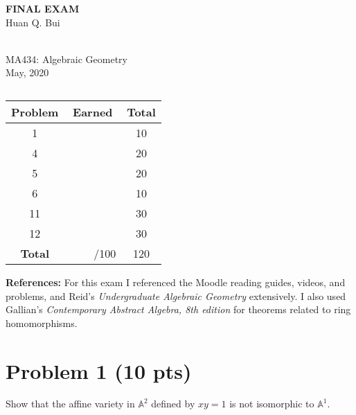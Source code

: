 \documentclass[12pt]{article}
\newcommand{\A}{\mathbb{A}}
\begin{document}
\begin{center}
	\LARGE{\textbf{FINAL EXAM}}
	\\
	\large{Huan Q. Bui}
	
	\noindent \hrulefill\\
	\small{MA434: Algebraic Geometry}\\
	\small{May, 2020}\\\vspace{-6pt}
	\hrulefill
\end{center}

 

$\,$\\
$\,$\\


\begin{center}
\begin{tabular}{|c|c|c|}
	\hline
	Problem & Earned & Total\\
	\hline
	1&&10\\
	\hline
	4&&20\\
	\hline
	5&&20\\
	\hline
	6&&10\\
	\hline
	11&&30\\
	\hline
	12&&30\\
	\hline
	\textbf{Total}&$\,\quad\quad$/100&120\\
	\hline
\end{tabular}
\end{center}



\noindent \textbf{References:} For this exam I referenced the Moodle reading guides, videos, and problems, and Reid's \textit{Undergraduate Algebraic Geometry} extensively. I also used Gallian's \textit{Contemporary Abstract Algebra, 8th edition} for theorems related to ring homomorphisms. \\


\newpage



%
%
%
%




\section*{Problem 1 \small{(10 pts)}}
Show that the affine variety in $\A^2$ defined by $xy=1$ is not isomorphic to $\A^1$. \\
\end{document}
